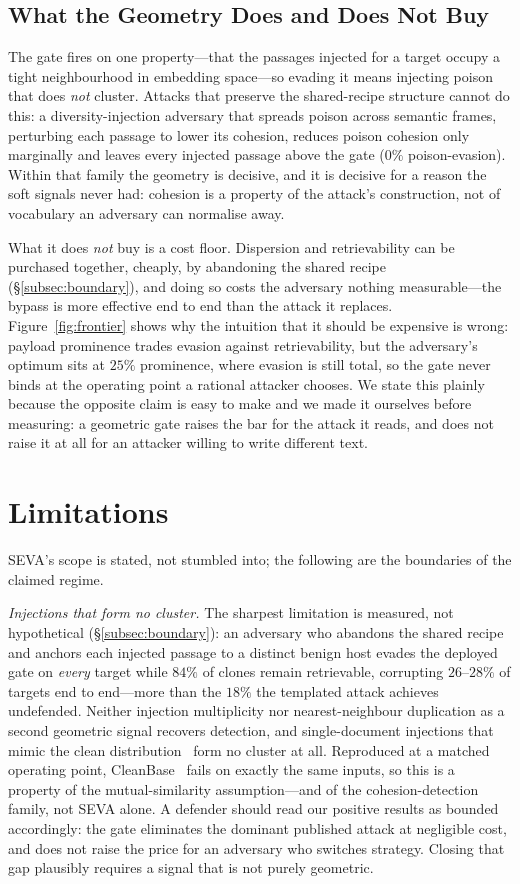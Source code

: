 \documentclass[conference]{IEEEtran}
\begin{document}
\subsection{What the Geometry Does and Does Not Buy}
The gate fires on one property---that the passages injected for a target occupy a tight
neighbourhood in embedding space---so evading it means injecting poison that does \emph{not}
cluster. Attacks that preserve the shared-recipe structure cannot do this: a diversity-injection
adversary that spreads poison across semantic frames, perturbing each passage to lower its
cohesion, reduces poison cohesion only marginally and leaves every injected passage above the
gate ($0\%$ poison-evasion). Within that family the geometry is decisive, and it is decisive for
a reason the soft signals never had: cohesion is a property of the attack's construction, not of
vocabulary an adversary can normalise away.

What it does \emph{not} buy is a cost floor. Dispersion and retrievability can be purchased
together, cheaply, by abandoning the shared recipe (\S\ref{subsec:boundary}), and doing so costs
the adversary nothing measurable---the bypass is more effective end to end than the attack it
replaces. Figure~\ref{fig:frontier} shows why the intuition that it should be expensive is
wrong: payload prominence trades evasion against retrievability, but the adversary's optimum
sits at $25\%$ prominence, where evasion is still total, so the gate never binds at the
operating point a rational attacker chooses. We state this plainly because the opposite claim is
easy to make and we made it ourselves before measuring: a geometric gate raises the bar for the
attack it reads, and does not raise it at all for an attacker willing to write different text.

\section{Limitations}
\label{sec:limits}
SEVA's scope is stated, not stumbled into; the following are the boundaries of the
claimed regime.

\emph{Injections that form no cluster.} The sharpest limitation is measured, not hypothetical
(\S\ref{subsec:boundary}): an adversary who abandons the shared recipe and anchors each injected
passage to a distinct benign host evades the deployed gate on \emph{every} target while $84\%$
of clones remain retrievable, corrupting $26$--$28\%$ of targets end to end---more than the
$18\%$ the templated attack achieves undefended. Neither injection multiplicity nor
nearest-neighbour duplication as a second geometric signal recovers detection, and
single-document injections that mimic the clean distribution~\cite{corruptrag} form no cluster
at all. Reproduced at a matched operating point, CleanBase~\cite{cleanbase} fails on exactly the
same inputs, so this is a property of the mutual-similarity assumption---and of the
cohesion-detection family, not SEVA alone. A defender should read our positive results as
bounded accordingly: the gate eliminates the dominant published attack at negligible cost, and
does not raise the price for an adversary who switches strategy. Closing that gap plausibly
requires a signal that is not purely geometric.
\end{document}
